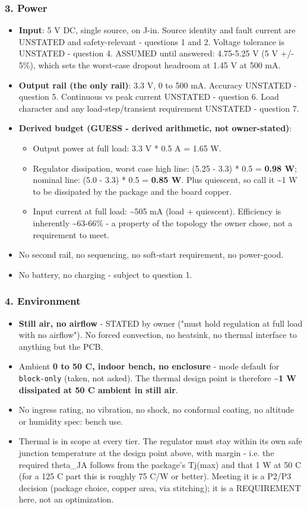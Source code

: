 \documentclass[11pt,a4paper]{article}
\begin{document}
\subsubsection*{3. Power}
\begin{itemize}
\item \textbf{Input}: 5 V DC, single source, on J-in. Source identity and fault current
are UNSTATED and safety-relevant - questions 1 and 2. Voltage tolerance is
UNSTATED - question 4. ASSUMED until answered: 4.75-5.25 V (5 V +/- 5\%),
which sets the worst-case dropout headroom at 1.45 V at 500 mA.
\item \textbf{Output rail (the only rail)}: 3.3 V, 0 to 500 mA. Accuracy UNSTATED -
question 5. Continuous vs peak current UNSTATED - question 6. Load character
and any load-step/transient requirement UNSTATED - question 7.
\item \textbf{Derived budget (GUESS - derived arithmetic, not owner-stated)}:
\begin{itemize}
\item Output power at full load: 3.3 V {*} 0.5 A = 1.65 W.
\item Regulator dissipation, worst case high line: (5.25 - 3.3) {*} 0.5 = \textbf{0.98 W};
nominal line: (5.0 - 3.3) {*} 0.5 = \textbf{0.85 W}. Plus quiescent, so call it
\textasciitilde{}1 W to be dissipated by the package and the board copper.
\item Input current at full load: \textasciitilde{}505 mA (load + quiescent). Efficiency is
inherently \textasciitilde{}63-66\% - a property of the topology the owner chose, not a
requirement to meet.
\end{itemize}
\item No second rail, no sequencing, no soft-start requirement, no power-good.
\item No battery, no charging - subject to question 1.
\end{itemize}
\subsubsection*{4. Environment}
\begin{itemize}
\item \textbf{Still air, no airflow} - STATED by owner ("must hold regulation at full
load with no airflow"). No forced convection, no heatsink, no thermal
interface to anything but the PCB.
\item Ambient \textbf{0 to 50 C, indoor bench, no enclosure} - mode default for
\texttt{block-only} (taken, not asked). The thermal design point is therefore
\textbf{\textasciitilde{}1 W dissipated at 50 C ambient in still air}.
\item No ingress rating, no vibration, no shock, no conformal coating, no altitude
or humidity spec: bench use.
\item Thermal is in scope at every tier. The regulator must stay within its own
safe junction temperature at the design point above, with margin - i.e. the
required theta\_JA follows from the package's Tj(max) and that 1 W at 50 C
(for a 125 C part this is roughly 75 C/W or better). Meeting it is a P2/P3
decision (package choice, copper area, via stitching); it is a REQUIREMENT
here, not an optimization.
\end{itemize}
\end{document}

